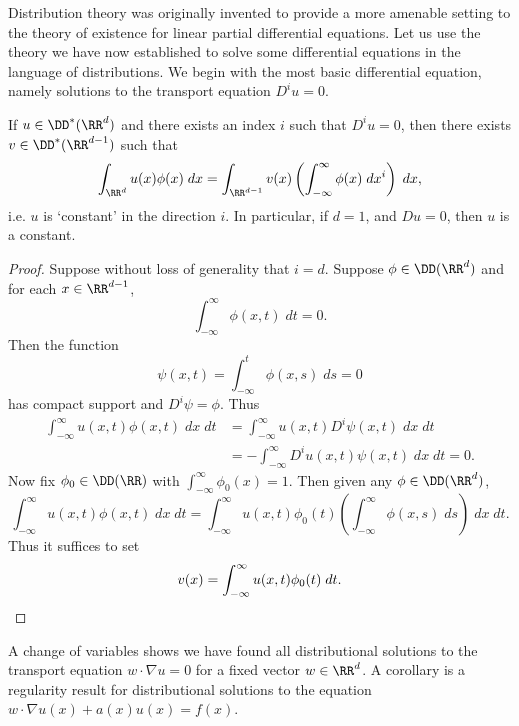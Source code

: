 Distribution theory was originally invented to provide a more amenable setting to the theory of existence for linear partial differential equations. Let us use the theory we have now established to solve some differential equations in the language of distributions. We begin with the most basic differential equation, namely solutions to the transport equation $D^i u = 0$.

\begin{theorem}
  If $u \in \DD^*(\RR^d)$ and there exists an index $i$ such that $D^i u = 0$, then there exists $v \in \DD^*(\RR^{d-1})$ such that
  \[ \int_{\RR^d} u(x) \phi(x)\; dx = \int_{\RR^{d-1}} v(x) \left( \int_{-\infty}^\infty \phi(x)\; dx^i \right)\; dx, \]
  i.e. $u$ is `constant' in the direction $i$. In particular, if $d = 1$, and $D u = 0$, then $u$ is a constant.
\end{theorem}
\begin{proof}
  Suppose without loss of generality that $i = d$. Suppose $\phi \in \DD(\RR^d)$ and for each $x \in \RR^{d-1}$,
  \[ \int_{-\infty}^\infty \phi(x,t)\; dt = 0. \]
  Then the function
  \[ \psi(x,t) = \int_{-\infty}^t \phi(x,s)\; ds = 0 \]
  has compact support and $D^i \psi = \phi$. Thus
  \begin{align*}
    \int_{-\infty}^\infty u(x,t) \phi(x,t)\; dx\; dt &= \int_{-\infty}^\infty u(x,t) D^i \psi(x,t)\; dx\; dt\\
    &= - \int_{-\infty}^\infty D^i u(x,t) \psi(x,t)\; dx\; dt = 0.
  \end{align*}
  Now fix $\phi_0 \in \DD(\RR)$ with $\int_{-\infty}^\infty \phi_0(x) = 1$. Then given any $\phi \in \DD(\RR^d)$,
  \[ \int_{-\infty}^\infty u(x,t) \phi(x,t)\; dx\; dt = \int_{-\infty}^\infty u(x,t) \phi_0(t) \left( \int_{-\infty}^\infty \phi(x,s)\; ds \right)\; dx\; dt. \]
  Thus it suffices to set
  \[ v(x) = \int_{-\infty}^\infty u(x,t) \phi_0(t)\; dt. \qedhere \]
\end{proof}

A change of variables shows we have found all distributional solutions to the transport equation $w \cdot \nabla u = 0$ for a fixed vector $w \in \RR^d$. A corollary is a regularity result for distributional solutions to the equation $w \cdot \nabla u(x) + a(x) u(x) = f(x)$.

